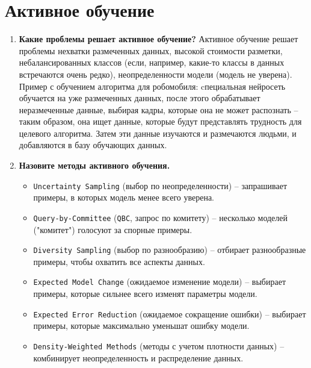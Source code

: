 \documentclass{article}
\begin{document}
\section{Активное обучение}
\begin{enumerate}
    \item \textbf{Какие проблемы решает активное обучение?}
        Активное обучение решает проблемы нехватки размеченных данных, высокой стоимости разметки, небалансированных классов (если, например, какие-то классы в данных встречаются очень редко), неопределенности модели (модель не уверена).\\
        Пример с обучением алгоритма для робомобиля: cпециальная нейросеть обучается на уже размеченных данных, после этого обрабатывает неразмеченные данные, выбирая кадры, которые она не может распознать -- таким образом, она ищет данные, которые будут представлять трудность для целевого алгоритма. Затем эти данные изучаются и размечаются людьми, и добавляются в базу обучающих данных.
    \item \textbf{Назовите методы активного обучения.}
        \begin{itemize}
            \item \texttt{Uncertainty Sampling} (выбор по неопределенности) -- запрашивает примеры, в которых модель менее всего уверена.
            \item  \texttt{Query-by-Committee} (\texttt{QBC}, запрос по комитету) -- несколько моделей ("комитет") голосуют за спорные примеры.
            \item \texttt{Diversity Sampling} (выбор по разнообразию) -- отбирает разнообразные примеры, чтобы охватить все аспекты данных.
            \item \texttt{Expected Model Change} (ожидаемое изменение модели) -- выбирает примеры, которые сильнее всего изменят параметры модели.
            \item \texttt{Expected Error Reduction} (ожидаемое сокращение ошибки) -- выбирает примеры, которые максимально уменьшат ошибку модели.
            \item \texttt{Density-Weighted Methods} (методы с учетом плотности данных) -- комбинирует неопределенность и распределение данных.
        \end{itemize}
\end{enumerate}
\end{document}
